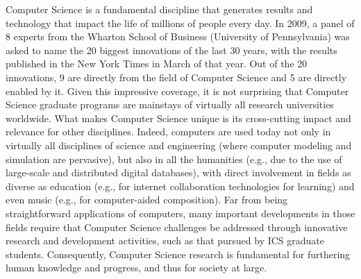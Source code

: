\documentclass[12pt]{article}
\begin{document}
Computer Science is a fundamental discipline that generates results and
technology that impact the life of millions of people every day. In 2009, a
panel of 8 experts from the Wharton School of Business (University of
Pennsylvania) was asked to name the 20 biggest innovations of the last 30
years, with the results published in the New York Times in March of that
year. Out of the 20 innovations, 9 are directly from the field of Computer
Science and 5 are directly enabled by it. Given this impressive coverage,
it is not surprising that Computer Science graduate programs are mainstays
of virtually all research universities worldwide.  What makes Computer
Science unique is its cross-cutting impact and relevance for other
disciplines. Indeed, computers are used today not only in virtually all
disciplines of science and engineering (where computer modeling and
simulation are pervasive), but also in all the humanities (e.g., due to the
use of large-scale and distributed digital databases), with direct
involvement in fields as diverse as education (e.g., for internet
collaboration technologies for learning) and even music (e.g., for
computer-aided composition).  Far from being straightforward applications
of computers, many important developments in those fields require that
Computer Science challenges be addressed through innovative research and
development activities, such as that pursued by ICS graduate students.
Consequently, Computer Science research is fundamental for furthering human
knowledge and progress, and thus for society at large.
\end{document}
